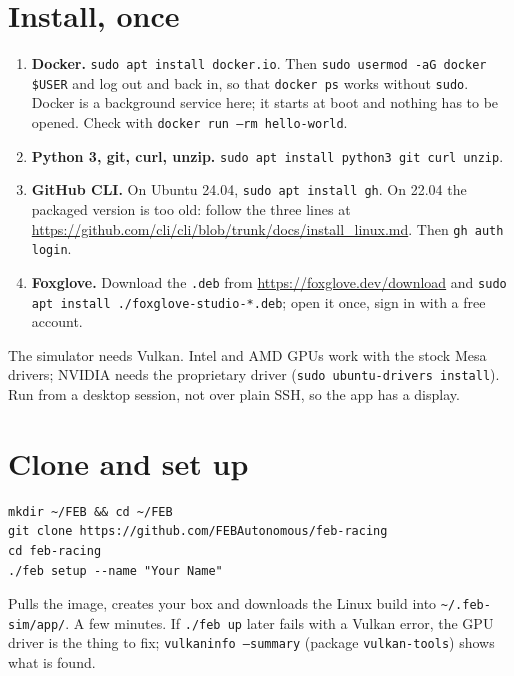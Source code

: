 
\section{Install, once}

\begin{enumerate}
  \item \textbf{Docker.} \texttt{sudo apt install docker.io}. Then
  \texttt{sudo usermod -aG docker \$USER} and log out and back in, so that \texttt{docker ps}
  works without \texttt{sudo}. Docker is a background service here; it starts at boot and nothing
  has to be opened. Check with \texttt{docker run --rm hello-world}.
  \item \textbf{Python 3, git, curl, unzip.} \texttt{sudo apt install python3 git curl unzip}.
  \item \textbf{GitHub CLI.} On Ubuntu 24.04, \texttt{sudo apt install gh}. On 22.04 the packaged
  version is too old: follow the three lines at
  \url{https://github.com/cli/cli/blob/trunk/docs/install_linux.md}. Then \texttt{gh auth login}.
  \item \textbf{Foxglove.} Download the \texttt{.deb} from \url{https://foxglove.dev/download} and
  \texttt{sudo apt install ./foxglove-studio-*.deb}; open it once, sign in with a free account.
\end{enumerate}

The simulator needs Vulkan. Intel and AMD GPUs work with the stock Mesa drivers; NVIDIA needs
the proprietary driver (\texttt{sudo ubuntu-drivers install}). Run from a desktop session, not
over plain SSH, so the app has a display.

\section{Clone and set up}

\begin{lstlisting}
mkdir ~/FEB && cd ~/FEB
git clone https://github.com/FEBAutonomous/feb-racing
cd feb-racing
./feb setup --name "Your Name"
\end{lstlisting}

Pulls the image, creates your box and downloads the Linux build into \texttt{\textasciitilde/.feb-sim/app/}.
A few minutes. If \texttt{./feb up} later fails with a Vulkan error, the GPU driver is the
thing to fix; \texttt{vulkaninfo --summary} (package \texttt{vulkan-tools}) shows what is found.

